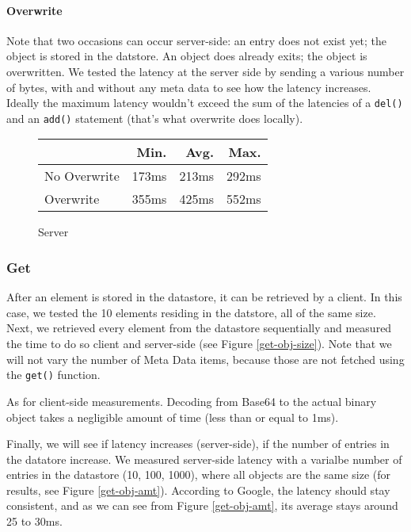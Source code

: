 \paragraph{Overwrite}
Note that two occasions can occur server-side: an entry does not exist yet; the
object is stored in the datstore. An object does already exits; the object is
overwritten. We tested the latency at the server side by sending a various
number of bytes, with and without any meta data to see how the latency
increases. Ideally the maximum latency wouldn't exceed the sum of the latencies
of a \texttt{del()} and an \texttt{add()} statement (that's what overwrite
does locally).

\begin{figure}
\begin{tabular}{|l|r|r|r|}
\hline
 & Min. & Avg. & Max. \\
\hline
No Overwrite & 173ms & 213ms & 292ms \\
Overwrite & 355ms & 425ms & 552ms \\
\hline
\end{tabular}
\caption{Server}
\end{figure}

\subsubsection{Get}
After an element is stored in the datastore, it can be retrieved by a client.
In this case, we tested the 10 elements residing in the datstore, all of the
same size. Next, we retrieved every element from the datastore sequentially and
measured the time to do so client and server-side (see Figure
\ref{get-obj-size}). Note that we will not vary the number of Meta Data items,
because those are not fetched using the \texttt{get()} function.

As for client-side measurements. Decoding from Base64 to the actual binary
object takes a negligible amount of time (less than or equal to 1ms).

Finally, we will see if latency increases (server-side), if the number of
entries in the datatore increase. We measured server-side latency with a
varialbe number of entries in the datastore (10, 100, 1000), where all objects
are the same size (for results, see Figure \ref{get-obj-amt}). According to
Google, the latency should stay consistent, and as we can see from Figure
\ref{get-obj-amt}, its average stays around 25 to 30ms.

